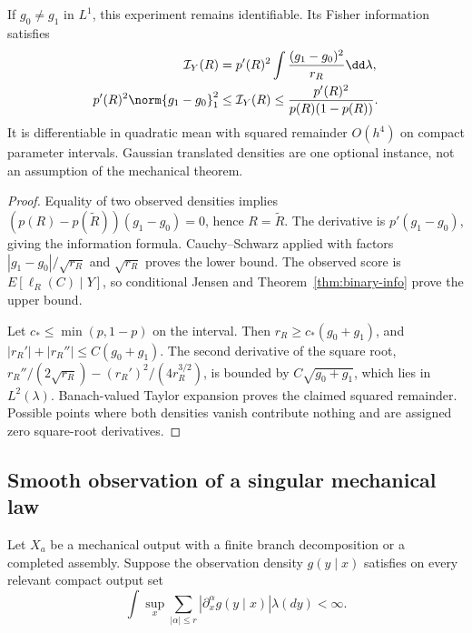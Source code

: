 \begin{theorem}\label{thm:channel-info}
If $g_0\ne g_1$ in $L^1$, this experiment remains identifiable. Its Fisher information satisfies
\begin{align}
 \mathcal I_Y(R)&=p'(R)^2\int\frac{(g_1-g_0)^2}{r_R}\dd\lambda,\\
 p'(R)^2\norm{g_1-g_0}_1^2&\le\mathcal I_Y(R)
 \le\frac{p'(R)^2}{p(R)(1-p(R))}.
 \label{eq:channel-info}
\end{align}
It is differentiable in quadratic mean with squared remainder $O(h^4)$ on compact parameter intervals. Gaussian translated densities are one optional instance, not an assumption of the mechanical theorem.
\end{theorem}
\begin{proof}
Equality of two observed densities implies $(p(R)-p(\widetilde R))(g_1-g_0)=0$, hence $R=\widetilde R$. The derivative is $p'(g_1-g_0)$, giving the information formula. Cauchy--Schwarz applied with factors $|g_1-g_0|/\sqrt{r_R}$ and $\sqrt{r_R}$ proves the lower bound. The observed score is $E[\ell_R(C)\mid Y]$, so conditional Jensen and Theorem~\ref{thm:binary-info} prove the upper bound.

Let $c_*\le\min(p,1-p)$ on the interval. Then $r_R\ge c_*(g_0+g_1)$, and $|r_R'|+|r_R''|\le C(g_0+g_1)$. The second derivative of the square root,
$r_R''/(2\sqrt{r_R})-(r_R')^2/(4r_R^{3/2})$, is bounded by $C\sqrt{g_0+g_1}$, which lies in $L^2(\lambda)$. Banach-valued Taylor expansion proves the claimed squared remainder. Possible points where both densities vanish contribute nothing and are assigned zero square-root derivatives.
\end{proof}

\subsection{Smooth observation of a singular mechanical law}
Let $X_a$ be a mechanical output with a finite branch decomposition or a completed assembly. Suppose the observation density $g(y\mid x)$ satisfies on every relevant compact output set
\[
 \int\sup_x\sum_{|\alpha|\le r}|\partial_x^\alpha g(y\mid x)|\lambda(dy)<\infty.
\]

